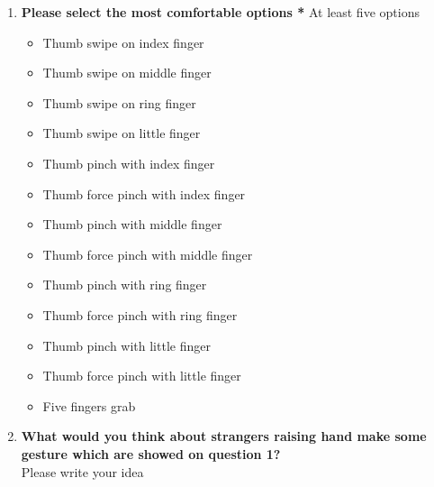   \begin{enumerate}
      \kaishu
      \item \textbf{Please select the most comfortable options *}
      At least five options
      \begin{itemize}
        \item Thumb swipe on index finger
        \item Thumb swipe on middle finger
        \item Thumb swipe on ring finger
        \item Thumb swipe on little finger
        \item Thumb pinch with index finger
        \item Thumb force pinch with index finger
        \item Thumb pinch with middle finger
        \item Thumb force pinch with middle finger
        \item Thumb pinch with ring finger
        \item Thumb force pinch with ring finger
        \item Thumb pinch with little finger
        \item Thumb force pinch with little finger
        \item Five fingers grab
      \end{itemize}
      \item \textbf{What would you think about strangers raising hand make some gesture which are showed on question 1?}\\
      Please write your idea


\end{enumerate}
